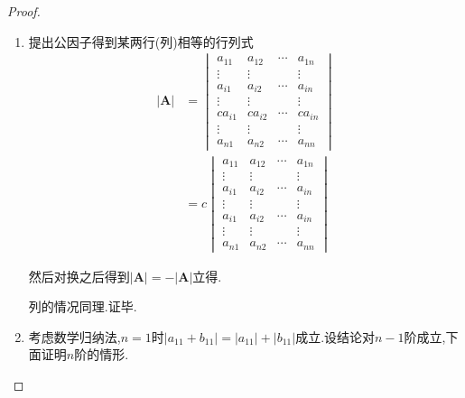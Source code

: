 {\begin{proof}
\begin{enumerate}[label = {\textup{(\arabic*)}}]
            \item 提出公因子得到某两行(列)相等的行列式\begin{align*}
                      \left|\bm{A}\right| & =\begin{vmatrix}
                                                 a_{11}  & a_{12}  & \cdots & a_{1n}  \\
                                                 \vdots  & \vdots  &        & \vdots  \\
                                                 a_{i1}  & a_{i2}  & \cdots & a_{in}  \\
                                                 \vdots  & \vdots  &        & \vdots  \\
                                                 ca_{i1} & ca_{i2} & \cdots & ca_{in} \\
                                                 \vdots  & \vdots  &        & \vdots  \\
                                                 a_{n1}  & a_{n2}  & \cdots & a_{nn}
                                             \end{vmatrix} \\
                                          & =c\begin{vmatrix}
                                                  a_{11} & a_{12} & \cdots & a_{1n} \\
                                                  \vdots & \vdots &        & \vdots \\
                                                  a_{i1} & a_{i2} & \cdots & a_{in} \\
                                                  \vdots & \vdots &        & \vdots \\
                                                  a_{i1} & a_{i2} & \cdots & a_{in} \\
                                                  \vdots & \vdots &        & \vdots \\
                                                  a_{n1} & a_{n2} & \cdots & a_{nn}
                                              \end{vmatrix}
                  \end{align*}

                  然后对换之后得到$\left|\bm{A}\right|=-\left|\bm{A}\right|$立得.

                  列的情况同理.证毕.
            \item 考虑数学归纳法,$n=1$时$\left|a_{11}+b_{11}\right|=\left|a_{11}\right|+\left|b_{11}\right|$成立.设结论对$n-1$阶成立,下面证明$n$阶的情形.


\end{enumerate}
\end{proof}}
